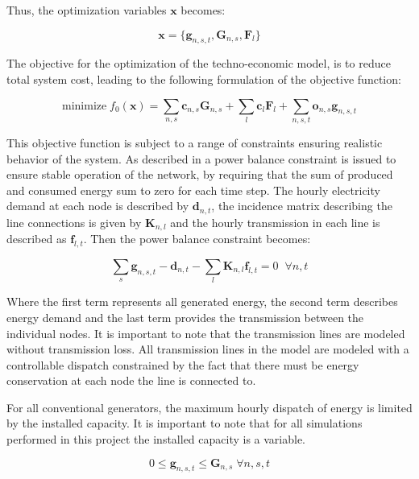 Thus, the optimization variables $\mathbf{x}$ becomes: 

\begin{equation}\label{eq:Optimization_variables}
\mathbf{x} = \{ \mathbf{g}_{n,s,t} , \mathbf{G}_{n,s} , \mathbf{F}_{l} \}
\end{equation}

The objective for the optimization of the techno-economic model, is to reduce total system cost, leading to the following formulation of the objective function: 

\begin{equation}
\text{minimize} \; f_0(\mathbf{x}) =  \sum_{n,s} \mathbf{c}_{n,s} \mathbf{G}_{n,s} + \sum_l \mathbf{c}_l \mathbf{F}_l + \sum_{n,s,t} \mathbf{o}_{n,s} \mathbf{g}_{n,s,t} 
\end{equation}{}

This objective function is subject to a range of constraints ensuring realistic behavior of the system. As described in \cite{PyPSA_euro_30_model} a power balance constraint is issued to ensure stable operation of the network, by requiring that the sum of produced and consumed energy sum to zero for each time step. The hourly electricity demand at each node is described by $\mathbf{d}_{n,t}$, the incidence matrix describing the line connections is given by $\mathbf{K}_{n,l}$ and the hourly transmission in each line is described as $\mathbf{f}_{l,t}$. Then the power balance constraint becomes: 

\begin{equation} \label{eq:equality_constraint}
\sum_s \mathbf{g}_{n,s,t} - \mathbf{d}_{n,t} - \sum_l \mathbf{K}_{n,l} \mathbf{f}_{l,t} = 0  \; \; \forall n,t
\end{equation}

Where the first term represents all generated energy, the second term describes energy demand and the last term provides the transmission between the individual nodes. It is important to note that the transmission lines are modeled without transmission loss. All transmission lines in the model are modeled with a controllable dispatch constrained by the fact that there must be energy conservation at each node the line is connected to.

For all conventional generators, the maximum hourly dispatch of energy is limited by the installed capacity. It is important to note that for all simulations performed in this project the installed capacity is a variable. 

\begin{equation}
0\leq \mathbf{g}_{n,s,t} \leq \mathbf{G}_{n,s} \; \forall n,s,t
\end{equation}

